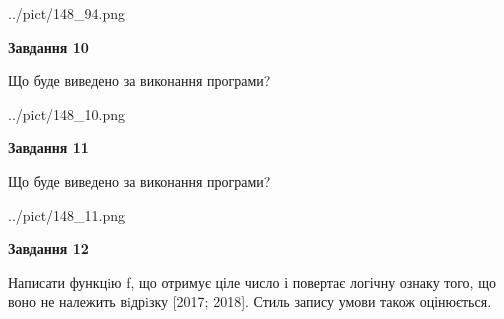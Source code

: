 \documentclass[12pt, ukrainian]{article}
\begin{document}
{\begin {large}
\begin{center}
	{../pict/148_94.png}
\end{center}
\newpage

{\begin {center}\textbf{Завдання 10}\end {center}}

Що буде виведено за виконання програми?\par
\begin{center}
	{../pict/148_10.png}
\end{center}
\newpage

{\begin {center}\textbf{Завдання 11}\end {center}}

Що буде виведено за виконання програми?\par
\begin{center}
	{../pict/148_11.png}
\end{center}
\newpage

{\begin {center}\textbf{Завдання 12}\end {center}}


Написати функцiю f, що отримує ціле число і повертає логічну ознаку того, що воно не належить вiдрiзку [2017; 2018]. Стиль запису умови також оцінюється.\par
\newpage

\end {large}}
\end{document}
